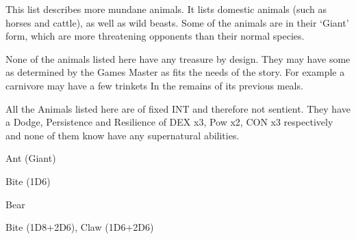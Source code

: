 This list describes more mundane animals. It lists domestic animals (such as horses and cattle), as well as wild beasts. Some of the animals are in their ‘Giant’ form, which are more threatening opponents than their normal species.

None of the animals listed here have any treasure by design. They may have some as determined by the Games Master as fits the needs of the story. For example a carnivore may have a few trinkets In the remains of its previous meals.

All the Animals listed here are of fixed INT and therefore not sentient. They have a Dodge, Persistence and Resilience of DEX x3, Pow x2, CON x3 respectively and none of them know have any supernatural abilities.

\vspace{1em}

\begin{samepage}
\begin{monsterbox}{Ant (Giant)}
	\basics[%
        hitpoints  = 12, 
	majorwound = 6,
	damagemodifier = 0,
	movementrate = 15m,
	armor = Chitin (5AP),
	]
	\rpghline%
	\stats[ %
		STR = 4D6   (14),
		CON = 3D6+6 (17),
		DEX = 2D6+6 (13),
		SIZ = 2D6   (7),
		INT = 2     (2),
		POW = 1D6+3 (6),
		CHA = 5     (5)
	]
	\rpghline%
	\begin{rpg-monsteraction}
		Bite (1D6)
	\end{rpg-monsteraction}
\end{monsterbox}
\end{samepage}


\begin{samepage}
\begin{monsterbox}{Bear}
	\basics[%
        hitpoints  = 19, 
	majorwound = 10,
	damagemodifier = 0,
	movementrate = 23m,
	armor = Tough hide (3AP),
	]
	\rpghline%
	\stats[ %
		STR = 3D6+15 (25),
		CON = 2D6+6  (13),
		DEX = 3D6    (11),
		SIZ = 3D6+15 (25),
		INT = 5     (5),
		POW = 3D6   (11),
		CHA = 5     (5)
	]
	\rpghline%
	\begin{rpg-monsteraction}
		Bite (1D8+2D6), Claw (1D6+2D6)
	\end{rpg-monsteraction}
\end{monsterbox}
\end{samepage}

